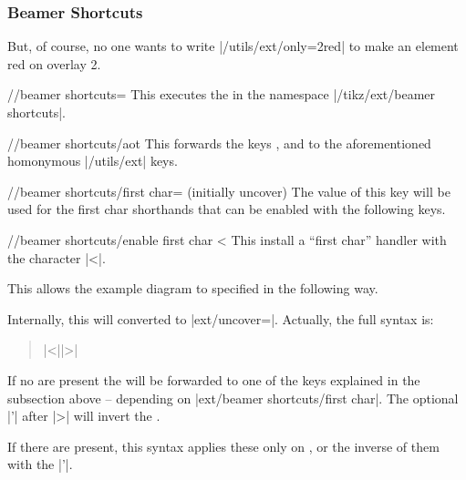 \subsubsection{Beamer Shortcuts}
But, of course, no one wants to write |/utils/ext/only={2}{red}| to
make an element red on overlay 2.
\begin{key}{/\tikzext/beamer shortcuts=}
  This executes the  in the namespace |/tikz/ext/beamer shortcuts|.
\end{key}
\begin{key}{/\tikzext/beamer shortcuts/aot}
  This forwards the keys , 
  and  to the aforementioned homonymous |/utils/ext| keys.
\end{key}
\begin{key}{/\tikzext/beamer shortcuts/first char=%
   (initially uncover)}
  The value of this key will be used for the first char shorthands that can be enabled with the following keys.
\end{key}
\begin{key}{/\tikzext/beamer shortcuts/enable first char <}
  This install a \enquote{first char} handler with the character |<|.
  
  This allows the example diagram to specified in the following way.
\begin{codeexample}[preamble=\usetikzlibrary{ext.beamer} \setbeamercovered{transparent},code only]
\end{codeexample}

  Internally, this will converted to |ext/uncover=|.
  Actually, the full syntax is:
  \begin{quote}
      |<||>|
  \end{quote}
  
  If no  are present the  will
  be forwarded to one of the keys explained in the subsection above
  -- depending on |ext/beamer shortcuts/first char|.
  The optional |'| after |>| will invert the .
  
  If there are  present, this syntax applies these only on ,
  or the inverse of them with the |'|.
\end{key}
